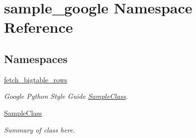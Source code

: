 \hypertarget{namespacesample__google}{\section{sample\-\_\-google Namespace Reference}
\label{namespacesample__google}
}
\subsection*{Namespaces}
\begin{DoxyCompactItemize}
\item 
\hyperlink{namespacesample__google_1_1fetch__bigtable__rows}{fetch\-\_\-bigtable\-\_\-rows}
\begin{DoxyCompactList}\small\item\em Google Python Style Guide \hyperlink{namespacesample__google_1_1_sample_class}{Sample\-Class}. \end{DoxyCompactList}\item 
\hyperlink{namespacesample__google_1_1_sample_class}{Sample\-Class}
\begin{DoxyCompactList}\small\item\em Summary of class here. \end{DoxyCompactList}\end{DoxyCompactItemize}
